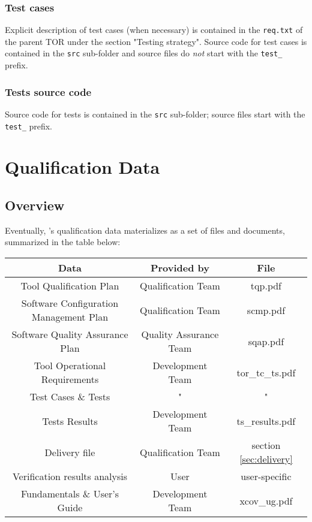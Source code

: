 \documentclass {report}
\begin{document}
\subsection{Test cases}
Explicit description of test cases (when necessary) is contained in the \texttt{req.txt} of the parent TOR under the section "Testing strategy". Source code for test cases is contained in the \texttt{src} sub-folder and source files do \emph{not} start with the \texttt{test\_} prefix. 

\subsection{Tests source code}
Source code for tests is contained in the \texttt{src} sub-folder; source files start with the \texttt{test\_} prefix. 


\chapter{Qualification Data}

\section{Overview}
\label{sec:qd-overview}

Eventually, \xcov{}'s qualification data materializes as a set of files and
documents, summarized in the table below:

\begin{tabular}{|c|c|c|}
\hline
\textbf{Data} & \textbf{Provided by} & \textbf{File} \\ \hline
Tool Qualification Plan & Qualification Team & tqp.pdf \\ \hline
Software Configuration Management Plan & Qualification Team & scmp.pdf \\ \hline
Software Quality Assurance Plan & Quality Assurance Team & sqap.pdf \\ \hline
Tool Operational Requirements & Development Team & tor\_tc\_ts.pdf \\ \hline
Test Cases \& Tests & " & " \\ \hline
Tests Results & Development Team & ts\_results.pdf \\ \hline
Delivery file & Qualification Team & section \ref{sec:delivery} \\ \hline
Verification results analysis & User & user-specific \\ \hline
\xcov{} Fundamentals \& User's Guide & Development Team & xcov\_ug.pdf \\ \hline
\end{tabular}
\end{document}

